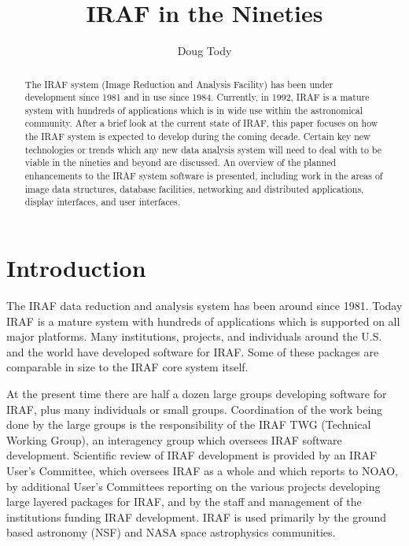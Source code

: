 \parskip=4pt



\title{IRAF in the Nineties}

\author{Doug Tody}


\begin{abstract}
The IRAF system (Image Reduction and Analysis Facility) has been under
development since 1981 and in use since 1984.  Currently, in 1992, IRAF is a
mature system with hundreds of applications which is in wide use within the
astronomical community.  After a brief look at the current state of IRAF,
this paper focuses on how the IRAF system is expected to develop during the
coming decade.  Certain key new technologies or trends which any new data
analysis system will need to deal with to be viable in the nineties and
beyond are discussed.  An overview of the planned enhancements to the IRAF
system software is presented, including work in the areas of image data
structures, database facilities, networking and distributed applications,
display interfaces, and user interfaces.
\end{abstract}


\section {Introduction}

The IRAF data reduction and analysis system has been around since 1981.
Today IRAF is a mature system with hundreds of applications which is supported
on all major platforms.  Many institutions, projects, and individuals around
the U.S. and the world have developed software for IRAF.  Some of these
packages are comparable in size to the IRAF core system itself.

At the present time there are half a dozen large groups developing software
for IRAF, plus many individuals or small groups.  Coordination of the work
being done by the large groups is the responsibility of the IRAF TWG
(Technical Working Group), an interagency group which oversees IRAF software
development.  Scientific review of IRAF development is provided by an IRAF
User's Committee, which oversees IRAF as a whole and which reports to NOAO,
by additional User's Committees reporting on the various projects developing
large layered packages for IRAF, and by the staff and management of the
institutions funding IRAF development.  IRAF is used primarily by the ground
based astronomy (NSF) and NASA space astrophysics communities.

